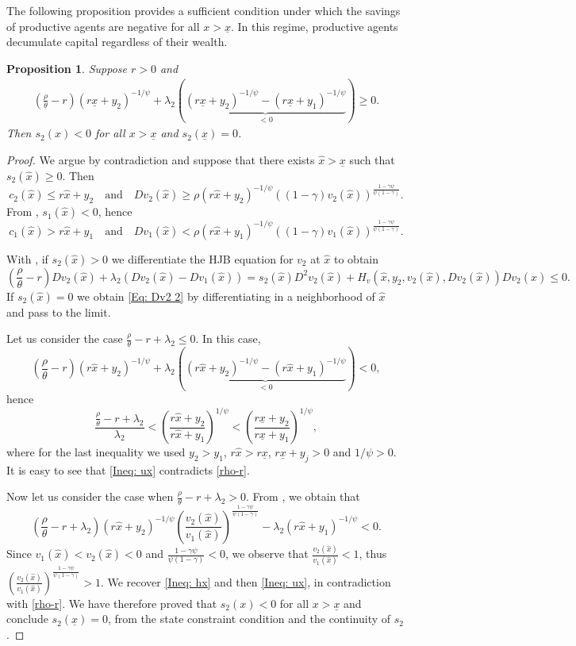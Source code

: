 \documentclass[11pt]{article}
\numberwithin{equation}{section}
\newtheorem{prop}[thm]{Proposition}
\theoremstyle{definition}
\newcommand{\ux}{{\underline x}}
\newcommand{\beq}{\begin{equation}}
\newcommand{\eeq}{\end{equation}}
\newcommand{\g}{\gamma}
\newcommand{\p}{\psi}
\newcommand{\hx}{\hat{x}}
\newcommand{\lc}{\left(}
\newcommand{\rc}{\right)}
\theoremstyle{plain}
\begin{document}
The following proposition provides a sufficient condition under which the savings of productive agents are negative for all $x > \ux$. In this regime, productive agents decumulate capital regardless of their wealth.
\begin{prop}\label{Prop:s2boundary}
Suppose $r>0$ and 
\beq\label{rho-r}
\begin{aligned}
\lc \frac{\rho}{\theta}-r\rc(r\ux+y_2)^{-1/\psi}+\lambda_2\lc \underbrace{(r\ux+y_2)^{-1/\psi}-(r\ux+y_1)^{-1/\psi}}_{<0}\rc\geq 0.
\end{aligned}
\eeq
Then $s_2(x)<0$ for all $x>\ux$ and $s_2(\ux)=0$. 
\end{prop}
\begin{proof}
We argue by contradiction and suppose that there exists $\hx>\ux$ such that $s_2(\hx)\geq 0$. Then 
$$
c_2(\hx)\leq r\hx+y_2\quad {\text{and}}\quad Dv_2(\hx)\geq \rho(r\hx+y_2)^{-1/\psi}((1-\g)v_2(\hx))^{\frac{1-\g \psi}{\psi(1-\g)}}. 
$$
From , $s_1(\hx)<0$, hence
$$
c_1(\hx)>r\hx+y_1\quad {\text{and}}\quad Dv_1(\hx)<\rho(r\hx+y_1)^{-1/\psi}((1-\g)v_1(\hx))^{\frac{1-\g \psi}{\psi(1-\g)}}. 
$$

With , if $s_2(\hx)> 0$ we differentiate the HJB equation for $v_2$ at $\hx$ to obtain
\beq\label{Eq: Dv2 2}
\lc \frac{\rho}{\theta}-r\rc Dv_2(\hx)+\lambda_2\lc Dv_2(\hx)-Dv_1(\hx)\rc=s_2(\hx)D^2v_2(\hx)+H_v(\hx,y_2,v_2(\hx),Dv_2(\hx))Dv_2(\hx)\leq 0.
\eeq
{If $s_2(\hx)=0$ we obtain \cref{Eq: Dv2 2} by differentiating in a neighborhood of $\hx$ and pass to the limit.}\par
{Let us consider the case $\frac{\rho}{\theta}-r+\lambda_2 \leq 0$. In this case,}
\beq\label{Ineq: hx}
\lc \frac{\rho}{\theta}-r\rc(r\hx+y_2)^{-1/\psi}+\lambda_2\lc \underbrace{(r\hx+y_2)^{-1/\psi}-(r\hx+y_1)^{-1/\psi}}_{<0}\rc< 0,
\eeq
hence
\beq\label{Ineq: ux}
\frac{\frac{\rho}{\theta}-r+\lambda_2}{\lambda_2}<\lc \frac{r\hx+y_2}{r\hx+y_1}\rc^{1/\p}<\lc \frac{r\ux+y_2}{r\ux+y_1}\rc^{1/\p},
\eeq
where for the last inequality we used $y_2>y_1$, $r\hx>r\ux$, $r\ux+y_j>0$ and $1/\p>0$. It is easy to see that \eqref{Ineq: ux} contradicts \eqref{rho-r}. \par
Now let us consider the case when $\frac{\rho}{\theta}-r+\lambda_2 > 0$. From , we obtain that
$$
\lc \frac{\rho}{\theta}-r+\lambda_2 \rc (r\hx+y_2)^{-1/\psi}\lc\frac{v_2(\hx)}{v_1(\hx)}\rc^{\frac{1-\g \psi}{\psi(1-\g)}}-\lambda_2 (r\hx+y_1)^{-1/\psi}<0.
$$
Since $v_1(\hx)<v_2(\hx)<0$ and $\frac{1-\g \psi}{\psi(1-\g)}<0$, we observe that
$
\frac{v_2(\hx)}{v_1(\hx)}<1$, thus
$ \lc\frac{v_2(\hx)}{v_1(\hx)}\rc^{\frac{1-\g \psi}{\psi(1-\g)}}>1$.
We recover \eqref{Ineq: hx} and then \eqref{Ineq: ux}, in contradiction with \eqref{rho-r}. We have therefore proved that $s_2(x)<0$ for all $x>\ux$ and conclude $s_2(\ux)=0$, from the state constraint condition and the continuity of $s_2$. 
\end{proof}
\end{document}
